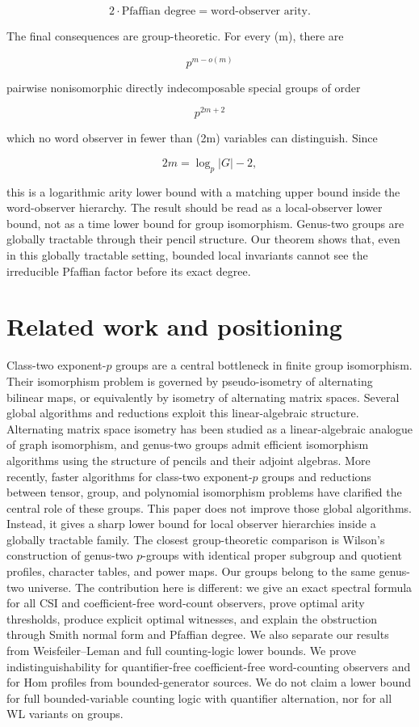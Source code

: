 \documentclass[11pt]{article}
\begin{document}
\[
\boxed{
2\cdot\text{Pfaffian degree}=
\text{word-observer arity}.
}
\]

The final consequences are group-theoretic. For every (m), there are

\[
p^{m-o(m)}
\]

pairwise nonisomorphic directly indecomposable special groups of order

\[
p^{2m+2}
\]

which no word observer in fewer than (2m) variables can distinguish. Since

\[
2m=\log_p |G|-2,
\]

this is a logarithmic arity lower bound with a matching upper bound inside the word-observer hierarchy. The result should be read as a local-observer lower bound, not as a time lower bound for group isomorphism. Genus-two groups are globally tractable through their pencil structure. Our theorem shows that, even in this globally tractable setting, bounded local invariants cannot see the irreducible Pfaffian factor before its exact degree.

\section{Related work and positioning}

Class-two exponent-$p$ groups are a central bottleneck in finite group isomorphism. Their isomorphism problem is governed by pseudo-isometry of alternating bilinear maps, or equivalently by isometry of alternating matrix spaces. Several global algorithms and reductions exploit this linear-algebraic structure. Alternating matrix space isometry has been studied as a linear-algebraic analogue of graph isomorphism, and genus-two groups admit efficient isomorphism algorithms using the structure of pencils and their adjoint algebras. More recently, faster algorithms for class-two exponent-$p$ groups and reductions between tensor, group, and polynomial isomorphism problems have clarified the central role of these groups. This paper does not improve those global algorithms. Instead, it gives a sharp lower bound for local observer hierarchies inside a globally tractable family. The closest group-theoretic comparison is Wilson's construction of genus-two $p$-groups with identical proper subgroup and quotient profiles, character tables, and power maps. Our groups belong to the same genus-two universe. The contribution here is different: we give an exact spectral formula for all CSI and coefficient-free word-count observers, prove optimal arity thresholds, produce explicit optimal witnesses, and explain the obstruction through Smith normal form and Pfaffian degree. We also separate our results from Weisfeiler--Leman and full counting-logic lower bounds. We prove indistinguishability for quantifier-free coefficient-free word-counting observers and for Hom profiles from bounded-generator sources. We do not claim a lower bound for full bounded-variable counting logic with quantifier alternation, nor for all WL variants on groups.
\end{document}
